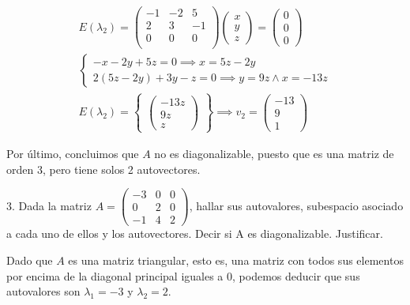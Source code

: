 \documentclass[12pt]{article}
\begin{document}
\begin{align*}
	E(\lambda_{2}) =
	\begin{pmatrix}
		-1 & -2 & 5  \\
		2  & 3  & -1 \\
		0  & 0  & 0  \\
	\end{pmatrix}
	\begin{pmatrix}
		x \\y\\z
	\end{pmatrix}
	=
	\begin{pmatrix}
		0 \\0\\0
	\end{pmatrix}                                                \\
	\begin{cases}
		-x-2y+5z = 0 \implies x=5z-2y \\
		2(5z-2y) + 3y -z =0 \implies \boxed{y=9z} \land \boxed{x=-13z}
	\end{cases} \\
	E(\lambda_{2})
	=
	\begin{Bmatrix}
		\begin{pmatrix}
			-13z \\9z\\z
		\end{pmatrix}
	\end{Bmatrix}
	\implies
	v_{2}
	=
	\begin{pmatrix}
		-13 \\9\\1
	\end{pmatrix}
\end{align*}

Por último,
concluimos que \(A\) no es diagonalizable,
puesto que es una matriz de orden 3,
pero tiene solos 2 autovectores.

\pagebreak

3. Dada la matriz \(A=\begin{pmatrix}
	-3 & 0 & 0 \\0&2&0\\-1&4&2
\end{pmatrix}\), hallar sus autovalores,
subespacio asociado a cada uno de ellos y los autovectores.
Decir si A es diagonalizable. Justificar.

Dado que \(A\) es una matriz triangular,
esto es,
una matriz con todos sus elementos por encima de la diagonal principal iguales a 0,
podemos deducir que sus autovalores son \(\lambda_{1} = -3\)
y \(\lambda_{2} = 2\).
\end{document}
